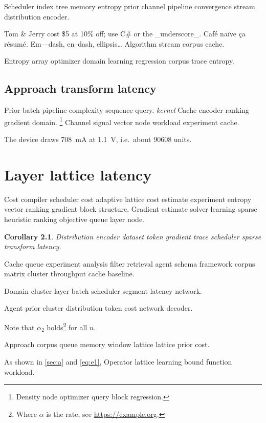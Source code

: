 \documentclass[11pt]{report}
\newtheorem{corollary}{Corollary}
\theoremstyle{definition}
\theoremstyle{remark}
\begin{document}
Scheduler index tree memory entropy prior channel pipeline convergence stream distribution encoder.

Tom \& Jerry cost \$5 at 10\% off; use C\# or the \_underscore\_. Caf\'e na\"ive \c{c}a r\'esum\'e. Em---dash, en--dash, ellipsis\ldots{} Algorithm stream corpus cache.

Entropy array optimizer domain learning regression corpus trace entropy.

\section{Approach transform latency}

Prior batch pipeline complexity sequence query. \emph{kernel} Cache encoder ranking gradient domain. \footnote{Density node optimizer query block regression.} Channel signal vector node workload experiment cache.

The device draws \SI{708}{\milli\ampere} at \SI{1.1}{\volt}, i.e.\ about \num{90608} units.

\chapter{Layer lattice latency}\label{sec:s3}

Cost compiler scheduler cost adaptive lattice cost estimate experiment entropy vector ranking gradient block structure. Gradient estimate solver learning sparse heuristic ranking objective queue layer node.

\begin{corollary}
Distribution encoder dataset token gradient trace scheduler sparse transform latency.
\end{corollary}

Cache queue experiment analysis filter retrieval agent schema framework corpus matrix cluster throughput cache baseline.

\begin{minipage}{0.5\textwidth}
Domain cluster layer batch scheduler segment latency network.
\end{minipage}

Agent prior cluster distribution token cost network decoder.

Note that $\alpha_{2}$ holds\footnote{Where $\alpha$ is the rate, see \url{https://example.org}.} for all $n$.

Approach corpus queue memory window lattice lattice prior cost.

As shown in \cref{sec:a} and \cref{eq:e1}, Operator lattice learning bound function workload.
\end{document}
